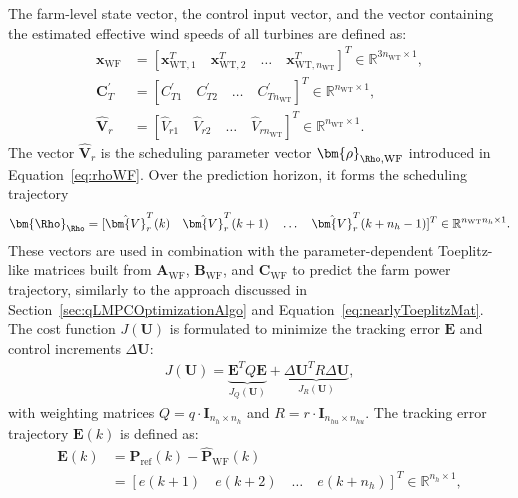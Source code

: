 The farm-level state vector, the control input vector, and the vector containing the estimated effective wind speeds of all turbines are defined as:
\begin{align*}
    \bm{x}_{\text{WF}} &= [\bm{x}_{\text{WT},1}^T \quad \bm{x}_{\text{WT},2}^T \quad \dots \quad \bm{x}_{\text{WT},n_{\text{WT}}}^T ]^T \in {\mathbb{R}}^{3n_\text{WT} \times 1},\\
    \bm{C}_{T}^\prime &= [C_{T1}^\prime \quad C_{T2}^\prime \quad \dots \quad C_{T n_{\text{WT}}}^\prime ]^T \in {\mathbb{R}}^{n_\text{WT} \times 1},\\
    \hat{\bm{V}}_r &= [\hat{V}_{r1} \quad \hat{V}_{r2} \quad \dots \quad \hat{V}_{r n_\text{WT}}]^T \in {\mathbb{R}}^{n_\text{WT}\times 1}.
\end{align*}
The vector $\hat{\bm{V}}_r$ is the scheduling parameter vector $\bm{\rho}_{\Rho,\text{WF}}$ introduced in Equation~\eqref{eq:rhoWF}. Over the prediction horizon, it forms the scheduling trajectory
\begin{align*}
    \bm{\Rho}_{\Rho} = [ \hat{\bm{V}}_r^T(k) \quad \hat{\bm{V}}_r^T(k+1) \quad \ldots \quad \hat{\bm{V}}_r^T(k+n_h-1)]^T \in \mathbb{R}^{n_{\text{WT}} n_h \times 1}.
\end{align*}
%
These vectors are used in combination with the parameter-dependent Toeplitz-like matrices built from $\bm{A}_{\text{WF}}$, $\bm{B}_{\text{WF}}$, and $\bm{C}_{\text{WF}}$ to predict the farm power trajectory, similarly to the approach discussed in Section~\ref{sec:qLMPCOptimizationAlgo} and Equation~\eqref{eq:nearlyToeplitzMat}.
The cost function $J(\bm{U})$ is formulated to minimize the tracking error $\bm{E}$ and control increments $\Delta \bm{U}$:
\begin{align} \label{eq:NMPCcostAIC}
    J(\bm{U}) = \underbrace{\bm{E}^T Q \bm{E}}_{J_Q (\bm{U})} + \underbrace{\Delta \bm{U}^T R \Delta \bm{U} }_{J_R ( \bm{U})},
\end{align}
with weighting matrices $Q = q \cdot \bm{I}_{n_h \times n_h}$ and $R = r \cdot \bm{I}_{n_{hu}\times n_{hu}}$. The tracking error trajectory $\bm{E}(k)$ is defined as:
\begin{equation}\label{eq:errortraject}
    \begin{aligned}
        \bm{E}(k) &= \bm{P}_{\text{ref}}(k) - \hat{\bm{P}}_{\text{WF}}(k) \\
        &= [ e(k+1) \quad e(k+2) \quad \dots \quad e(k + n_h) ]^T \in \mathbb{R}^{n_h \times 1},
    \end{aligned}
\end{equation}
